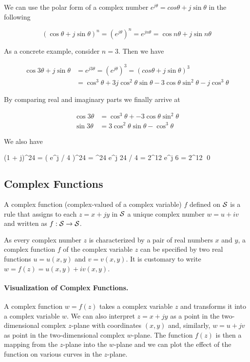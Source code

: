 We can use the polar form of a complex number $e^{j \theta} = cos \theta + j \sin \theta$ in the following

\begin{equation*}
    (\cos \theta + j \sin \theta)^n = \left( e^{j \theta} \right)^n = e^{j n \theta} = \cos n \theta+  j \sin n \theta
\end{equation*}

As a concrete example, consider $n=3$. Then we have

\begin{align*}
    \cos 3 \theta + j \sin \theta &= e^{j3 \theta} = \left(e^{j \theta}\right)^3 = (cos \theta + j \sin \theta)^3 \\
    &= \cos^3 \theta + 3j\cos^2 \theta \sin \theta - 3 \cos \theta \sin^2 \theta - j \cos^3 \theta
\end{align*}

By comparing real and imaginary parts we finally arrive at

\begin{align*}
    \cos 3 \theta &= \cos^3 \theta +  - 3 \cos \theta \sin^2 \theta \\
    \sin 3 \theta &= 3\cos^2 \theta \sin \theta - \cos^3 \theta
\end{align*}

We also have

\bee
(1 + j)^{24} = \left(  e^{j \pi / 4} \right)^{24} = ^{24} e^{j 24 \pi / 4} = 2^{12} e^{j 6 \pi} = 2^{12} \qed
\eee

\subsection{Complex Functions}

A complex function (complex-valued of a complex variable) $f$ defined on $\mathcal{S}$ is a rule that assigns to each $z = x+jy$ in $\mathcal{S}$ a unique complex number $w = u + iv$ and written as $f : \mathcal{S} \rightarrow \mathcal{S}$.

As every complex number $z$ is characterized by a pair of real numbers $x$ and $y$, a complex function $f$ of the complex variable $z$ can be specified by two real functions $u = u(x, y)$ and $v = v(x, y)$. It is customary to write $w = f (z) = u(x, y)+iv(x, y)$.


\paragraph{Visualization of Complex Functions.} A complex function $w = f(z)$ takes a complex variable $z$ and transforms it into a complex variable $w$. We can also interpret $z = x+jy$ as a point in the two-dimensional complex $z$-plane with coordinates $(x, y)$ and, similarly, $w = u+jv$ as point in the two-dimensional complex $w$-plane. The function $f(z)$ is then a mapping from the $z$-plane into the $w$-plane and we can plot the effect of the function on various curves in the $z$-plane.


